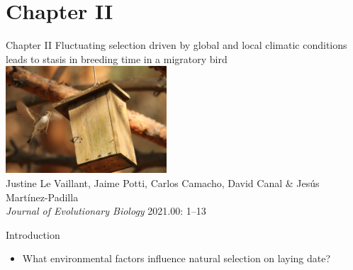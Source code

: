 \documentclass[compress]{beamer}
\begin{document}
\section{Chapter II}
\begin{frame}{Chapter II}
\centering 
\large{Fluctuating selection driven by global and local climatic conditions leads to stasis in breeding time in a migratory bird} \\
\vfill
\includegraphics[height = 4cm]{Photos/Nesting.JPG}\\
Justine Le Vaillant, Jaime Potti, Carlos Camacho, David Canal \& Jes\'{u}s Mart\'{i}nez-Padilla \\
\vfill \small{\textit{Journal of Evolutionary Biology} 2021.00: 1–13
}

\end{frame}
\begin{frame}{Introduction}
\begin{itemize}
\item \footnotesize{What environmental factors influence natural selection on laying date?} \\
\end{itemize}
 \vspace{0.2cm}
  \vspace{0.2cm}
 
\end{frame}
\end{document}
